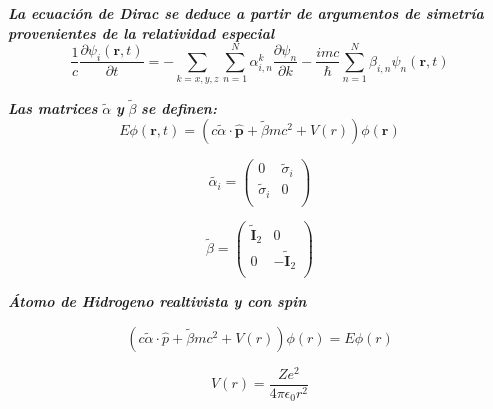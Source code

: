 \documentclass{beamer}
\begin{document}
\begin{frame}{\textit{\textbf{La ecuaci\'on de Dirac se deduce a partir de argumentos de simetr\'ia provenientes de la relatividad especial}}}
\[
\dfrac{1}{c}\dfrac{\partial \psi_i(\mathbf{r},t)}{\partial t} =
- \sum \limits_{k=x,y,z} \sum \limits_{n=1}^{N}\alpha^k_{i,n} \dfrac{\partial \psi_n}{\partial k} -
\dfrac{imc}{\hbar}\sum \limits_{n=1}^{N}\beta_{i,n}\psi_n(\mathbf{r}, t)
\]
\end{frame}

\begin{frame}{\textit{\textbf{Las matrices}} $\widetilde{\alpha}$ \textit{\textbf{y}} $\widetilde{\beta}$ \textit{\textbf{se definen:}}}
\begin{equation}
E\phi(\mathbf{r},t) =
(c\widetilde{\alpha}\cdot \hat{\mathbf{p}} + \widetilde{\beta}mc^2 + V(r))\phi(\mathbf{r})
\end{equation}

\begin{equation}
\widetilde{\alpha_i}=
\begin{pmatrix}
0 & \widetilde{\sigma}_i\\
\widetilde{\sigma}_i & 0 \\
\end{pmatrix}
\end{equation}

\begin{equation}
\widetilde{\beta}=
\begin{pmatrix}
\widetilde{\mathbf{I}}_2 & 0\\
0 & -\widetilde{\mathbf{I}}_2 \\
\end{pmatrix}
\end{equation}

\end{frame}

\begin{frame}{\textit{\textbf{\'Atomo de Hidrogeno realtivista y con spin}}}

\[
(c \widetilde{\alpha} \cdot \hat{p} + \widetilde{\beta} m c^2 + V(r) ) \phi(r) = E \phi (r)
\]

\begin{equation}
V(r) = \dfrac{Ze^2}{4\pi\epsilon_0 r^2}
\end{equation}
\end{frame}
\end{document}
